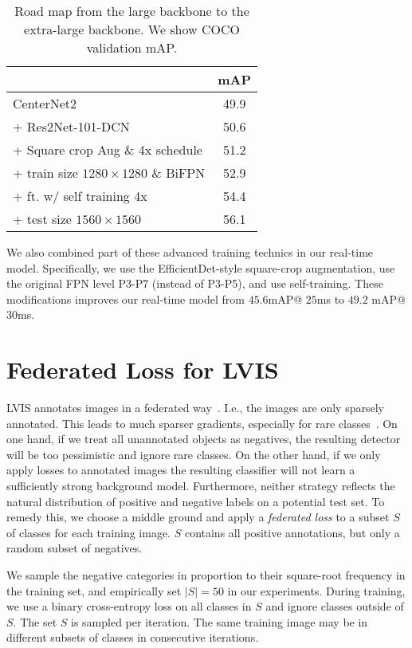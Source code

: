 \documentclass{article}
\begin{document}
\begin{table}[!t]
\centering
\begin{tabular}{l@{\ \ \ \ \ \ }c}
\toprule
 & mAP \\
\midrule
CenterNet2 & 49.9 \\
+ Res2Net-101-DCN & 50.6 \\
+ Square crop Aug \& 4x schedule & 51.2 \\
+ train size $1280\!\times\!1280$ \& BiFPN & 52.9 \\
+ ft. w/ self training 4x & 54.4 \\
+ test size $1560\!\times\!1560$ & 56.1 \\
\bottomrule
\end{tabular}
\vspace{-2mm}
\caption{Road map from the large backbone to the extra-large backbone. We show COCO validation mAP. }
\label{table:extralarge}
\vspace{-5mm}
\end{table}


We also combined part of these advanced training technics in our real-time model.
Specifically, we use the EfficientDet-style square-crop augmentation, use the original FPN level P3-P7 (instead of P3-P5), and use self-training.
These modifications improves our real-time model from $45.6$mAP@ $25$ms to $49.2$ mAP@ $30$ms.



\section{Federated Loss for LVIS}

LVIS annotates images in a federated way~\cite{gupta2019lvis}.
I.e., the images are only sparsely annotated.
This leads to much sparser gradients, especially for rare classes~\cite{tan2020eql}.
On one hand, if we treat all unannotated objects as negatives, the resulting detector will be too pessimistic and ignore rare classes.
On the other hand, if we only apply losses to annotated images the resulting classifier will not learn a sufficiently strong background model.
Furthermore, neither strategy reflects the natural distribution of positive and negative labels on a potential test set.
To remedy this, we choose a middle ground and apply a \emph{federated loss} to a subset $S$ of classes for each training image.
$S$ contains all positive annotations, but only a random subset of negatives.

We sample the negative categories in proportion to their square-root frequency in the training set, and empirically set $|S| = 50$ in our experiments.
During training, we use a binary cross-entropy loss on all classes in $S$ and ignore classes outside of $S$.
The set $S$ is sampled per iteration.
The same training image may be in different subsets of classes in consecutive iterations.
\end{document}
